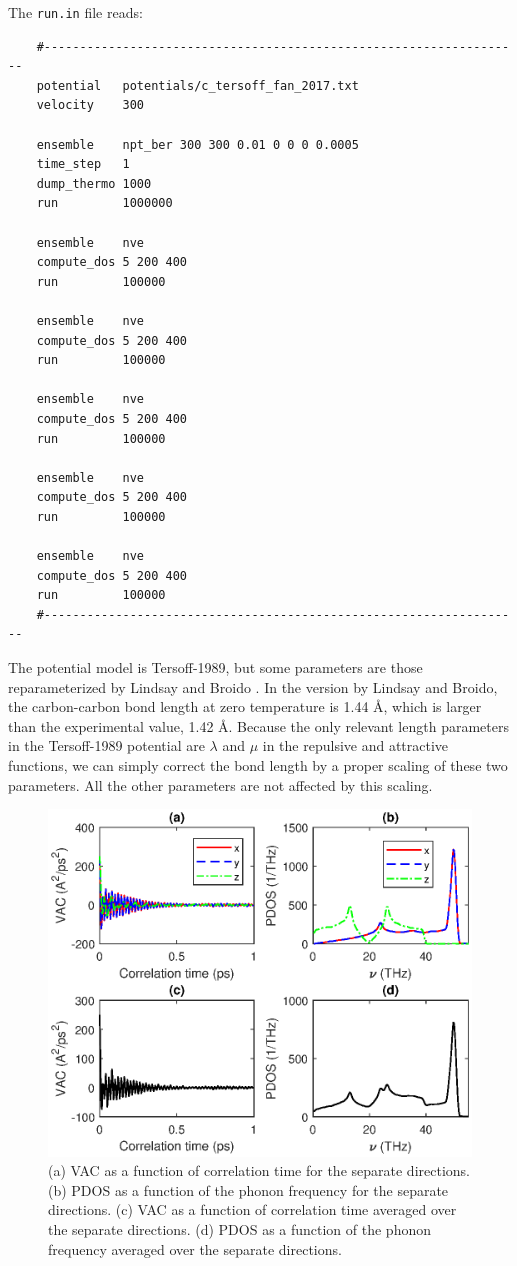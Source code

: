\documentclass[12pt,a4paper]{report}
\begin{document}
The \verb"run.in" file reads:
\begin{verbatim}
    #-------------------------------------------------------------------
    potential   potentials/c_tersoff_fan_2017.txt
    velocity    300

    ensemble    npt_ber 300 300 0.01 0 0 0 0.0005
    time_step   1
    dump_thermo 1000
    run         1000000

    ensemble    nve
    compute_dos 5 200 400
    run         100000

    ensemble    nve
    compute_dos 5 200 400
    run         100000

    ensemble    nve
    compute_dos 5 200 400
    run         100000

    ensemble    nve
    compute_dos 5 200 400
    run         100000

    ensemble    nve
    compute_dos 5 200 400
    run         100000
    #-------------------------------------------------------------------
\end{verbatim}

The potential model is Tersoff-1989, but some parameters are those reparameterized by Lindsay and Broido \cite{lindsay2010prb}. In the version by Lindsay and Broido, the carbon-carbon bond length at zero temperature is 1.44 \AA, which is larger than the experimental value, 1.42 \AA. Because the only relevant length parameters in the Tersoff-1989 potential are $\lambda$ and $\mu$ in the repulsive and attractive functions, we can simply correct the bond length by a proper scaling of these two parameters. All the other parameters are not affected by this scaling.

\begin{figure}[ht]
\begin{center}
\includegraphics[width=\columnwidth]{ex2.eps}
\caption{(a) VAC as a function of correlation time for the separate directions.
(b) PDOS as a function of the phonon frequency for the separate directions.
(c) VAC as a function of correlation time averaged over the separate directions.
(d) PDOS as a function of the phonon frequency averaged over the separate directions.}
\label{figure:graphene_vac_dos}
\end{center}
\end{figure}
\end{document}

